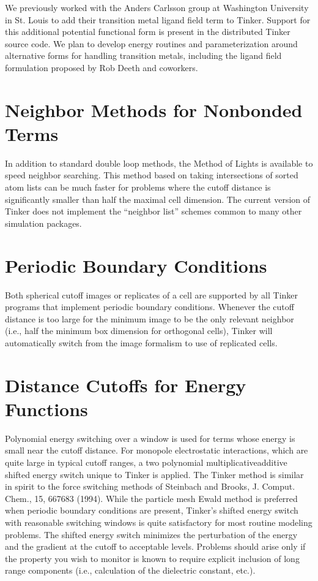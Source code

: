 \documentclass[letterpaper,11pt,english]{sphinxmanual}
\begin{document}
We previously worked with the Anders Carlsson group at Washington University in St. Louis to add their transition metal ligand field term to Tinker. Support for this additional potential functional form is present in the distributed Tinker source code. We plan to develop energy routines and parameterization around alternative forms for handling transition metals, including the ligand field formulation proposed by Rob Deeth and coworkers.


\section{Neighbor Methods for Nonbonded Terms}
\label{\detokenize{text/special-features:neighbor-methods-for-nonbonded-terms}}
In addition to standard double loop methods, the Method of Lights is available to speed neighbor searching. This method based on taking intersections of sorted atom lists can be much faster for problems where the cutoff distance is significantly smaller than half the maximal cell dimension. The current version of Tinker does not implement the “neighbor list” schemes common to many other simulation packages.


\section{Periodic Boundary Conditions}
\label{\detokenize{text/special-features:periodic-boundary-conditions}}
Both spherical cutoff images or replicates of a cell are supported by all Tinker programs that implement periodic boundary conditions. Whenever the cutoff distance is too large for the minimum image to be the only relevant neighbor (i.e., half the minimum box dimension for orthogonal cells), Tinker will automatically switch from the image formalism to use of replicated cells.


\section{Distance Cutoffs for Energy Functions}
\label{\detokenize{text/special-features:distance-cutoffs-for-energy-functions}}
Polynomial energy switching over a window is used for terms whose energy is small near the cutoff distance. For monopole electrostatic interactions, which are quite large in typical cutoff ranges, a two polynomial multiplicative\sphinxhyphen{}additive shifted energy switch unique to Tinker is applied. The Tinker method is similar in spirit to the force switching methods of Steinbach and Brooks, J. Comput. Chem., 15, 667\sphinxhyphen{}683 (1994). While the particle mesh Ewald method is preferred when periodic boundary conditions are present, Tinker’s shifted energy switch with reasonable switching windows is quite satisfactory for most routine modeling problems. The shifted energy switch minimizes the perturbation of the energy and the gradient at the cutoff to acceptable levels. Problems should arise only if the property you wish to monitor is known to require explicit inclusion of long range components (i.e., calculation of the dielectric constant, etc.).
\end{document}
